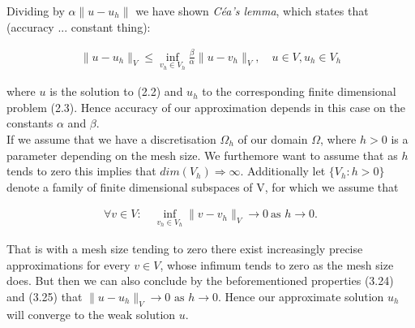 \documentclass[../draft_1.tex]{subfiles}
\begin{document}
Dividing by $\alpha \| u - u_h \| $ we have shown \textit{C\'{e}a's lemma}, which states that (accuracy ... constant thing):
\begin{ceqn}
\begin{equation}
\begin{aligned}
\| u - u_h \|_V \leq \inf_{v_h \in V_h} \frac{\beta}{\alpha} \| u - v_h \|_V, \quad u \in V, u_h \in V_h
\end{aligned}
\end{equation}
\end{ceqn}
where $u$ is the solution to (2.2) and $u_h$ to the corresponding finite dimensional problem (2.3). Hence accuracy of our approximation depends in this case on the constants $\alpha$ and $\beta$. 
\bigskip
\\ 
If we assume that we have a discretisation $\Omega_h$ of our domain $\Omega$, where $h > 0$ is a parameter depending on the mesh size.  We furthemore want to assume that as $h$ tends to zero this implies that $dim(V_h) \Rightarrow \infty$. Additionally let $\{V_h : h > 0\}$ denote a family of finite dimensional subspaces of V, for which we assume that
\begin{ceqn}
\begin{equation}
\begin{aligned}
\forall v \in V : \quad \inf_{v_h \in V_h} \| v - v_h\|_V \rightarrow 0 \ \text{as } h \rightarrow 0.
\end{aligned}
\end{equation}
\end{ceqn}
That is with a mesh size tending to zero there exist increasingly precise approximations for every $v \in V$, whose infimum tends to zero as the mesh size does. But then we can also conclude by  the beforementioned properties (3.24) and (3.25) that $\| u - u_h\|_V \rightarrow 0 \text{ as } h \rightarrow 0$. Hence our approximate solution $u_h$ will converge to the weak solution $u$. 
\end{document}
